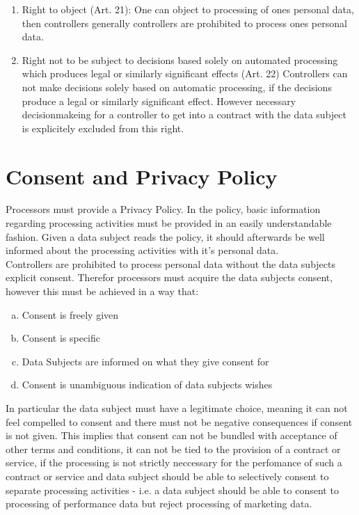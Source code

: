 \documentclass[a4paper,12pt]{report}
\begin{document}
\begin{enumerate}[]
		\item Right to object (Art. 21):
		One can object to processing of ones personal data, then controllers generally controllers are prohibited to process ones personal data.
		\item Right not to be subject to decisions based solely on automated processing which produces legal or similarly significant effects (Art. 22)
		Controllers can not make decisions solely based on automatic processing, if the decisions produce a legal or similarly significant effect. 
		However necessary decisionmakeing for a controller to get into a contract with the data subject is explicitely excluded from this right.
	\end{enumerate}
	\closesection

	\section{Consent and Privacy Policy}
	\startsection
	Processors must provide a Privacy Policy.
	In the policy, basic information regarding processing activities must be provided in an easily understandable fashion.
	Given a data subject reads the policy, it should afterwards be well informed about the processing activities with it's personal data.\\
	Controllers are prohibited to process personal data without the data subjects explicit consent.
	Therefor processors must acquire the data subjects consent, however this must be achieved in a way that:
	\begin{enumerate}[a)]
		\item Consent is freely given
		\item Consent is specific
		\item Data Subjects are informed on what they give consent for
		\item Consent is unambiguous indication of data subjects wishes
	\end{enumerate}
	In particular the data subject must have a legitimate choice, meaning it can not feel compelled to consent and there must not be negative consequences if consent is not given.
	This implies that consent can not be bundled with acceptance of other terms and conditions, 
	it can not be tied to the provision of a contract or service, if the processing is not strictly neccessary for the perfomance of such a contract or service and
	data subject should be able to selectively consent to separate processing activities - i.e. a data subject should be able to consent to processing of performance data but reject processing of marketing data.\\
\end{document}
